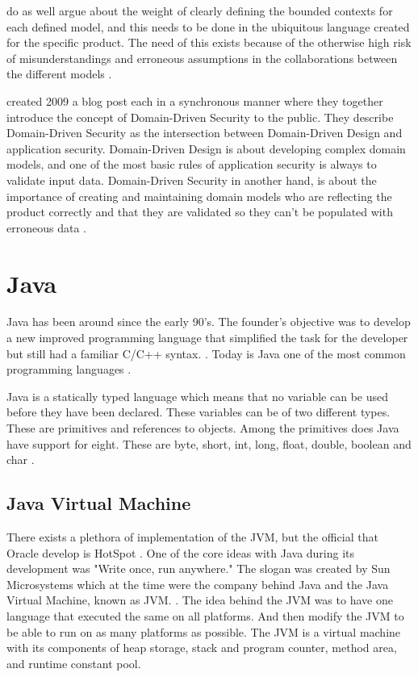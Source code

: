 \textcite{evans_2015} do as well argue about the weight of clearly defining the bounded contexts for each defined model, and this needs to be done in the ubiquitous language created for the specific product. The need of this exists because of the otherwise high risk of misunderstandings and erroneous assumptions in the collaborations between the different models \parencite{millett_2015}.

\textcite{Wilander2009, Johnsson2009} created 2009 a blog post each in a synchronous manner where they together introduce the concept of Domain-Driven Security to the public. They describe Domain-Driven Security as the intersection between Domain-Driven Design and application security. Domain-Driven Design is about developing complex domain models, and one of the most basic rules of application security is always to validate input data. Domain-Driven Security in another hand, is about the importance of creating and maintaining domain models who are reflecting the product correctly and that they are validated so they can't be populated with erroneous data \parencite{Wilander2009, Johnsson2009, Arnor2016, Stendahl2016}.


\section{Java}
\label{JavaInstrumentation}
Java has been around since the early 90's. The founder's objective was to develop a new improved programming language that simplified the task for the developer but still had a familiar C/C++ syntax. \parencite{OracleVoice}. Today is Java one of the most common programming languages \parencite{octoverse}.

Java is a statically typed language which means that no variable can be used before they have been declared. These variables can be of two different types. These are primitives and references to objects. Among the primitives does Java have support for eight. These are byte, short, int, long, float, double, boolean and char \parencite{primjav}.


\subsection{Java Virtual Machine}
There exists a plethora of implementation of the JVM, but the official that Oracle develop is HotSpot \parencite{hotSpot}. One of the core ideas with Java during its development was "Write once, run anywhere." The slogan was created by Sun Microsystems which at the time were the company behind Java and the Java Virtual Machine, known as JVM. \parencite{Craig_2006}. The idea behind the JVM was to have one language that executed the same on all platforms. And then modify the JVM to be able to run on as many platforms as possible. The JVM is a virtual machine with its components of heap storage, stack and program counter, method area, and runtime constant pool.


